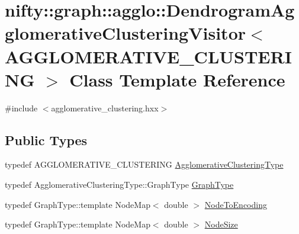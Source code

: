 \hypertarget{classnifty_1_1graph_1_1agglo_1_1DendrogramAgglomerativeClusteringVisitor}{}\section{nifty\+:\+:graph\+:\+:agglo\+:\+:Dendrogram\+Agglomerative\+Clustering\+Visitor$<$ A\+G\+G\+L\+O\+M\+E\+R\+A\+T\+I\+V\+E\+\_\+\+C\+L\+U\+S\+T\+E\+R\+I\+NG $>$ Class Template Reference}
\label{classnifty_1_1graph_1_1agglo_1_1DendrogramAgglomerativeClusteringVisitor}


{\ttfamily \#include $<$agglomerative\+\_\+clustering.\+hxx$>$}

\subsection*{Public Types}
\begin{DoxyCompactItemize}
\item 
typedef A\+G\+G\+L\+O\+M\+E\+R\+A\+T\+I\+V\+E\+\_\+\+C\+L\+U\+S\+T\+E\+R\+I\+NG \hyperlink{classnifty_1_1graph_1_1agglo_1_1DendrogramAgglomerativeClusteringVisitor_a78a8c905d28562d120d4827cbfbc57bc}{Agglomerative\+Clustering\+Type}
\item 
typedef Agglomerative\+Clustering\+Type\+::\+Graph\+Type \hyperlink{classnifty_1_1graph_1_1agglo_1_1DendrogramAgglomerativeClusteringVisitor_abbc8e2c55e4b0fc99bc0e52c9349e0a1}{Graph\+Type}
\item 
typedef Graph\+Type\+::template Node\+Map$<$ double $>$ \hyperlink{classnifty_1_1graph_1_1agglo_1_1DendrogramAgglomerativeClusteringVisitor_adccc2152f38cd44b4158f5e6847b5d6e}{Node\+To\+Encoding}
\item 
typedef Graph\+Type\+::template Node\+Map$<$ double $>$ \hyperlink{classnifty_1_1graph_1_1agglo_1_1DendrogramAgglomerativeClusteringVisitor_a02d2e28c63f59f3ad2a6fb1266652794}{Node\+Size}
\end{DoxyCompactItemize}
